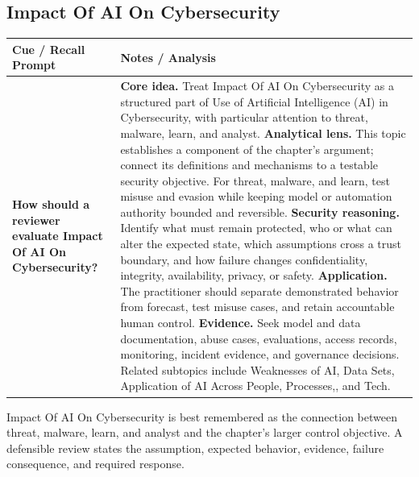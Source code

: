 \documentclass[11pt]{article}
\newcommand{\CornellHeader}{%
\rowcolor{Navy}\color{white}\bfseries Cue / Recall Prompt & \color{white}\bfseries Notes / Analysis\\\hline}
\newcommand{\CornellRow}[2]{%
\cellcolor{CueGray}\RaggedRight\textbf{#1} & \RaggedRight #2\\\hline}
\begin{document}
\subsection*{Impact Of AI On Cybersecurity}
\begin{longtable}{>{\RaggedRight\arraybackslash}p{}|>{\RaggedRight\arraybackslash}p{}}
\CornellHeader
\CornellRow{How should a reviewer evaluate Impact Of AI On Cybersecurity?}{\textbf{Core idea.} Treat Impact Of AI On Cybersecurity as a structured part of Use of Artificial Intelligence (AI) in Cybersecurity, with particular attention to threat, malware, learn, and analyst. \textbf{Analytical lens.} This topic establishes a component of the chapter's argument; connect its definitions and mechanisms to a testable security objective. For threat, malware, and learn, test misuse and evasion while keeping model or automation authority bounded and reversible. \textbf{Security reasoning.} Identify what must remain protected, who or what can alter the expected state, which assumptions cross a trust boundary, and how failure changes confidentiality, integrity, availability, privacy, or safety. \textbf{Application.} The practitioner should separate demonstrated behavior from forecast, test misuse cases, and retain accountable human control. \textbf{Evidence.} Seek model and data documentation, abuse cases, evaluations, access records, monitoring, incident evidence, and governance decisions. Related subtopics include Weaknesses of AI, Data Sets, Application of AI Across People, Processes,, and Tech.}
\end{longtable}
\begin{topicsummary}
Impact Of AI On Cybersecurity is best remembered as the connection between threat, malware, learn, and analyst and the chapter's larger control objective. A defensible review states the assumption, expected behavior, evidence, failure consequence, and required response.
\end{topicsummary}
\end{document}
